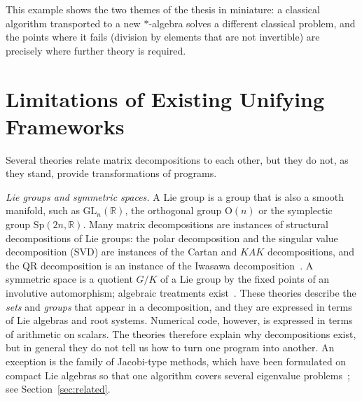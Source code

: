 \documentclass[12pt, a4paper]{report}
\theoremstyle{plain}
\theoremstyle{definition}
\theoremstyle{remark}
\theoremstyle{plain}
\newcommand{\RR}{\mathbb{R}}
\newcommand{\GL}{\mathrm{GL}}
\newcommand{\Or}{\mathrm{O}}
\newcommand{\Sp}{\mathrm{Sp}}
\begin{document}
This example shows the two themes of the thesis in miniature: a classical algorithm transported to a new $*$-algebra solves a different classical problem, and the points where it fails (division by elements that are not invertible) are precisely where further theory is required.

\section{Limitations of Existing Unifying Frameworks}
\label{sec:limitations}
Several theories relate matrix decompositions to each other, but they do not, as they stand, provide transformations of programs.

\emph{Lie groups and symmetric spaces.} A Lie group is a group that is also a smooth manifold, such as $\GL_n(\RR)$, the orthogonal group $\Or(n)$ or the symplectic group $\Sp(2n,\RR)$. Many matrix decompositions are instances of structural decompositions of Lie groups: the polar decomposition and the singular value decomposition (SVD) are instances of the Cartan and $KAK$ decompositions, and the QR decomposition is an instance of the Iwasawa decomposition~\cite{Helgason1978,EdelmanJeong2023}. A symmetric space is a quotient $G/K$ of a Lie group by the fixed points of an involutive automorphism; algebraic treatments exist~\cite{Loos1969}. These theories describe the \emph{sets} and \emph{groups} that appear in a decomposition, and they are expressed in terms of Lie algebras and root systems. Numerical code, however, is expressed in terms of arithmetic on scalars. The theories therefore explain why decompositions exist, but in general they do not tell us how to turn one program into another. An exception is the family of Jacobi-type methods, which have been formulated on compact Lie algebras so that one algorithm covers several eigenvalue problems~\cite{KleinsteuberHelmkeHuper2004}; see Section~\ref{sec:related}.
\end{document}
